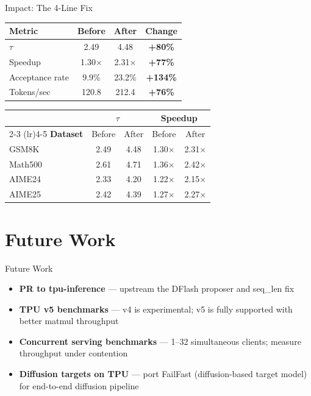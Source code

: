\documentclass[10pt]{beamer}
\begin{document}
\begin{frame}{Impact: The 4-Line Fix}
\centering
\begin{tabular}{lccc}
\toprule
\textbf{Metric} & \textbf{Before} & \textbf{After} & \textbf{Change} \\
\midrule
$\tau$ & 2.49 & 4.48 & \textbf{+80\%} \\
Speedup & 1.30$\times$ & 2.31$\times$ & \textbf{+77\%} \\
Acceptance rate & 9.9\% & 23.2\% & \textbf{+134\%} \\
Tokens/sec & 120.8 & 212.4 & \textbf{+76\%} \\
\bottomrule
\end{tabular}

\vspace{1em}
\footnotesize
\begin{tabular}{l cccc}
\toprule
& \multicolumn{2}{c}{\textbf{$\tau$}} & \multicolumn{2}{c}{\textbf{Speedup}} \\
\cmidrule(lr){2-3} \cmidrule(lr){4-5}
\textbf{Dataset} & Before & After & Before & After \\
\midrule
GSM8K   & 2.49 & 4.48 & 1.30$\times$ & 2.31$\times$ \\
Math500 & 2.61 & 4.71 & 1.36$\times$ & 2.42$\times$ \\
AIME24  & 2.33 & 4.20 & 1.22$\times$ & 2.15$\times$ \\
AIME25  & 2.42 & 4.39 & 1.27$\times$ & 2.27$\times$ \\
\bottomrule
\end{tabular}
\end{frame}

\section{Future Work}

\begin{frame}{Future Work}
\begin{itemize}
  \item \textbf{PR to tpu-inference} --- upstream the DFlash proposer and seq\_len fix
  \item \textbf{TPU v5 benchmarks} --- v4 is experimental; v5 is fully supported with better matmul throughput
  \item \textbf{Concurrent serving benchmarks} --- 1--32 simultaneous clients; measure throughput under contention
  \item \textbf{Diffusion targets on TPU} --- port FailFast (diffusion-based target model) for end-to-end diffusion pipeline
\end{itemize}
\end{frame}
\end{document}
